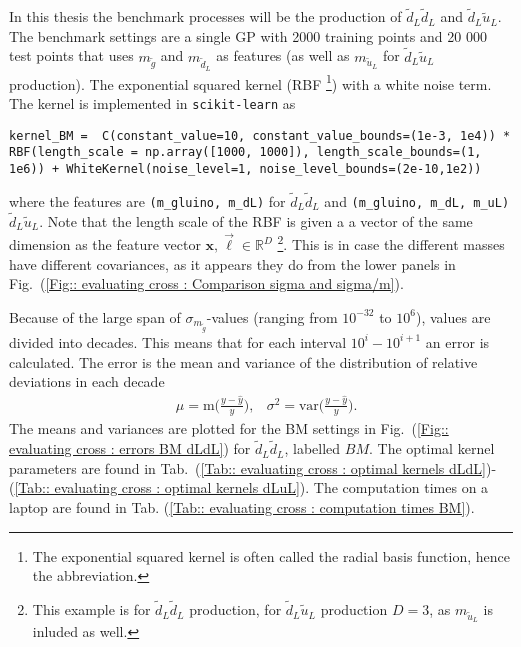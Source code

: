\documentclass[twoside,english]{uiofysmaster}
\begin{document}
In this thesis the benchmark processes will be the production of $\tilde{d}_L \tilde{d}_L$ and $\tilde{d}_L \tilde{u}_L$. The benchmark settings are a single GP with 2000 training points and 20 000 test points that uses $m_{\tilde{g}}$ and $m_{\tilde{d}_L}$ as features (as well as $m_{\tilde{u}_L}$ for $\tilde{d}_L \tilde{u}_L$ production). The exponential squared kernel (RBF \footnote{The exponential squared kernel is often called the radial basis function, hence the abbreviation.}) with a white noise term. The kernel is implemented in \verb|scikit-learn| as 
\begin{lstlisting}
kernel_BM =  C(constant_value=10, constant_value_bounds=(1e-3, 1e4)) * RBF(length_scale = np.array([1000, 1000]), length_scale_bounds=(1, 1e6)) + WhiteKernel(noise_level=1, noise_level_bounds=(2e-10,1e2))
\end{lstlisting} 
where the features are \verb|(m_gluino, m_dL)| for $\tilde{d}_L \tilde{d}_L$ and \verb|(m_gluino, m_dL, m_uL)| $\tilde{d}_L \tilde{u}_L$. Note that the length scale of the RBF is given a a vector of the same dimension as the feature vector $\textbf{x},\vec{\ell} \in \mathbb{R}^D$ \footnote{This example is for $\tilde{d}_L \tilde{d}_L$ production, for $\tilde{d}_L \tilde{u}_L$ production $D=3$, as $m_{\tilde{u}_L}$ is inluded as well.}. This is in case the different masses have different covariances, as it appears they do from the lower panels in Fig.\ (\ref{Fig:: evaluating cross : Comparison sigma and sigma/m}). 

Because of the large span of $\sigma_{m_{\tilde{g}}}$-values (ranging from $10^{-32}$ to $10^6$), values are divided into decades. This means that for each interval $10^i-10^{i+1}$ an error is calculated. The error is the mean and variance of the distribution of relative deviations in each decade
\begin{align}
& \mu = \text{m} \Bigg(\frac{y - \hat{y}}{y} \Bigg),
& \sigma^2 = \text{var} \Bigg(\frac{y - \hat{y}}{y} \Bigg).
\end{align}
The means and variances are plotted for the BM settings in Fig.\ (\ref{Fig:: evaluating cross : errors BM dLdL}) for $\tilde{d}_L \tilde{d}_L$, labelled $BM$. The optimal kernel parameters are found in Tab.\ (\ref{Tab:: evaluating cross : optimal kernels dLdL})-(\ref{Tab:: evaluating cross : optimal kernels dLuL}). The computation times on a laptop are found in Tab. (\ref{Tab:: evaluating cross : computation times BM}).
\end{document}
